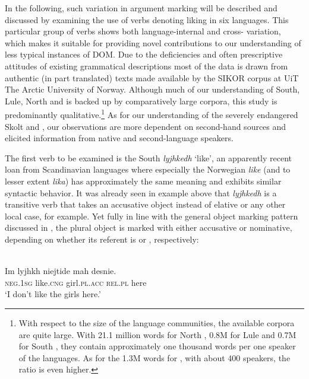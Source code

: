 \documentclass[output=paper]{LSP/langsci}
\begin{document}
 In the following, such variation in argument marking will be described and discussed by examining the use of  verbs denoting liking in six  languages. This particular group of verbs shows both language-internal and cross- variation, which makes it suitable for providing novel contributions to our understanding of less typical instances of DOM. Due to the deficiencies and often prescriptive attitudes of existing grammatical descriptions most of the data is drawn from authentic (in part translated) texts made available by the SIKOR corpus at UiT The Arctic University of Norway. Although much of our understanding of South, Lule, North and   is backed up by comparatively large corpora, this study is predominantly qualitative.\footnote{With respect to the size of the language communities, the available corpora are quite large. With 21.1 million words for North , 0.8M for Lule  and 0.7M for South , they contain approximately one thousand words per one speaker of the languages. As for the 1.3M words for  , with about 400 speakers, the ratio is even higher.} As for our understanding of the severely endangered Skolt  and , our observations are more dependent on second-hand sources and elicited information from native and second-language speakers.

 The first verb to be examined is the South  \textit{lyjhkedh} ‘like’, an apparently recent loan from Scandinavian languages where especially the Norwegian \textit{like} (and to lesser extent  \textit{lika}) has approximately the same meaning and exhibits similar syntactic behavior. It was already seen in example  above that \textit{lyjhkedh} is a transitive verb that takes an accusative object instead of elative or any other local case, for example. Yet fully in line with the general object marking pattern discussed in , the plural object is marked with either accusative or nominative, depending on whether its referent is   or  , respectively:

\begin{exe}
\ex%
\label{16-ki-ex:8}
\\
\gll Im lyjhkh niejtide mah desnie.\\
\textsc{neg}.\textsc{1sg} like.\textsc{cng} girl.\textsc{pl}.\textsc{acc} \textsc{rel}.\textsc{pl} here\\
\glt  ‘I don’t like the girls here.’ 
\end{exe}
\end{document}
